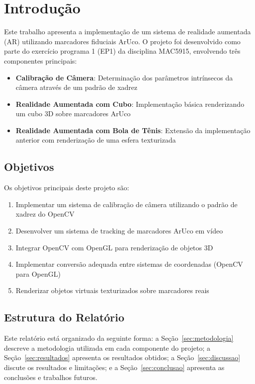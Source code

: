 \section{Introdução}

Este trabalho apresenta a implementação de um sistema de realidade aumentada (AR) utilizando marcadores fiduciais ArUco. O projeto foi desenvolvido como parte do exercício programa 1 (EP1) da disciplina MAC5915, envolvendo três componentes principais:

\begin{itemize}
    \item \textbf{Calibração de Câmera}: Determinação dos parâmetros intrínsecos da câmera através de um padrão de xadrez
    \item \textbf{Realidade Aumentada com Cubo}: Implementação básica renderizando um cubo 3D sobre marcadores ArUco
    \item \textbf{Realidade Aumentada com Bola de Tênis}: Extensão da implementação anterior com renderização de uma esfera texturizada
\end{itemize}

\subsection{Objetivos}

Os objetivos principais deste projeto são:

\begin{enumerate}
    \item Implementar um sistema de calibração de câmera utilizando o padrão de xadrez do OpenCV
    \item Desenvolver um sistema de tracking de marcadores ArUco em vídeo
    \item Integrar OpenCV com OpenGL para renderização de objetos 3D
    \item Implementar conversão adequada entre sistemas de coordenadas (OpenCV para OpenGL)
    \item Renderizar objetos virtuais texturizados sobre marcadores reais
\end{enumerate}

\subsection{Estrutura do Relatório}

Este relatório está organizado da seguinte forma: a Seção~\ref{sec:metodologia} descreve a metodologia utilizada em cada componente do projeto; a Seção~\ref{sec:resultados} apresenta os resultados obtidos; a Seção~\ref{sec:discussao} discute os resultados e limitações; e a Seção~\ref{sec:conclusao} apresenta as conclusões e trabalhos futuros.
